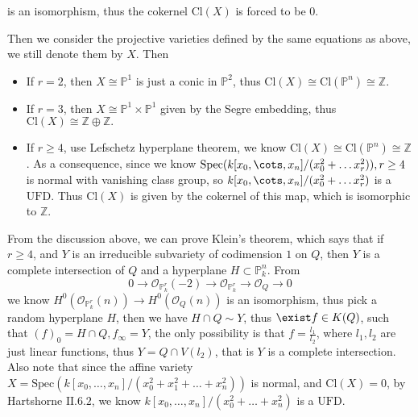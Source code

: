 \documentclass[../main.tex]{subfiles}
\begin{document}
\begin{example}
\begin{itemize}
is an isomorphism, thus the cokernel $\mathrm{Cl}(X)$ is forced to be $0$. 
\end{itemize}
Then we consider the projective varieties defined by the same equations as above, we still denote them by $X$. Then 
\begin{itemize}
\item If $r=2$, then $X\cong \mathbb{P}^{1}$ is just a conic in $\mathbb{P}^{2}$, thus $\mathrm{Cl}(X)\cong \mathrm{Cl}(\mathbb{P}^{n})\cong \mathbb{Z}$.
\item If $r=3$, then $X\cong \mathbb{P}^{1}\times \mathbb{P}^{1}$ given by the Segre embedding, thus $\mathrm{Cl}(X)\cong \mathbb{Z}\oplus \mathbb{Z}.$
\item If $r\geq 4$, use Lefschetz hyperplane theorem, we know $\mathrm{Cl}(X)\cong\mathrm{Cl}(\mathbb{P}^{n})\cong \mathbb{Z}$. As a consequence, since we know $\mathrm{Spec}(k[x_{0},\cots, x_{n}]/(x_{0}^{2}+\dots x_{r}^{2})), r\geq 4$ is normal with vanishing class group, so $k[x_{0},\cots, x_{n}]/(x_{0}^{2}+\dots x_{r}^{2})$ is a $\mathrm{UFD}$.
Thus $\mathrm{Cl}(X)$ is given by the cokernel of this map, which is isomorphic to $\mathbb{Z}$.

\end{itemize}
\end{example}
\begin{remark}

\end{remark}

\begin{remark}
From the discussion above, we can prove Klein's theorem, which says that if $r\geq 4$, and $Y$ is an irreducible subvariety of codimension $1$ on $Q$, then $Y$ is a complete intersection of $Q$ and a hyperplane $H\subset \mathbb{P}_{k}^{n}$. From
$$0\rightarrow \mathcal{O}_{\mathbb{P}_{k}^{r}}(-2)\rightarrow \mathcal{O}_{\mathbb{P}_{k}^{r}}\rightarrow \mathcal{O}_{Q}\rightarrow 0$$
we know $H^{0}(\mathcal{O}_{\mathbb{P}_{k}^{r}}(n))\rightarrow H^{0}(\mathcal{O}_{Q}(n))$ is an isomorphism, thus pick a random hyperplane $H$, then we have $H\cap Q\sim Y$, thus $\exist f\in K(Q)$, such that $(f)_{0}=H\cap Q, f_{\infty}=Y$, the only possibility is that $f=\frac{l_{1}}{l_{2}}$, where $l_{1}, l_{2}$ are just linear functions, thus $Y=Q\cap V(l_{2})$, that is $Y$ is a complete intersection. Also note that since the affine variety $X=\mathrm{Spec}(k[x_{0},\dots, x_{n}]/(x_{0}^{2}+x_{1}^{2}+\dots +x_{n}^{2}))$ is normal, and $\mathrm{Cl}(X)=0$, by Hartshorne $\mathrm{II}.6.2$, we know $k[x_{0},\dots, x_{n}]/(x_{0}^{2}+\dots + x_{n}^{2})$ is a $\mathrm{UFD}$.
\end{remark}
\end{document}
